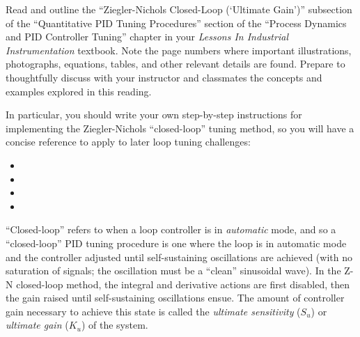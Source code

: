 

Read and outline the ``Ziegler-Nichols Closed-Loop (`Ultimate Gain')'' subsection of the ``Quantitative PID Tuning Procedures'' section of the ``Process Dynamics and PID Controller Tuning'' chapter in your {\it Lessons In Industrial Instrumentation} textbook.  Note the page numbers where important illustrations, photographs, equations, tables, and other relevant details are found.  Prepare to thoughtfully discuss with your instructor and classmates the concepts and examples explored in this reading.

\vskip 10pt

In particular, you should write your own step-by-step instructions for implementing the Ziegler-Nichols ``closed-loop'' tuning method, so you will have a concise reference to apply to later loop tuning challenges:

\begin{itemize}
\item{} 
\vskip 10pt
\item{} 
\vskip 10pt
\item{} 
\vskip 10pt
\item{} 
\end{itemize}














``Closed-loop'' refers to when a loop controller is in {\it automatic} mode, and so a ``closed-loop'' PID tuning procedure is one where the loop is in automatic mode and the controller adjusted until self-sustaining oscillations are achieved (with no saturation of signals; the oscillation must be a ``clean'' sinusoidal wave).  In the Z-N closed-loop method, the integral and derivative actions are first disabled, then the gain raised until self-sustaining oscillations ensue.  The amount of controller gain necessary to achieve this state is called the {\it ultimate sensitivity} ($S_u$) or {\it ultimate gain} ($K_u$) of the system.

\vskip 10pt

